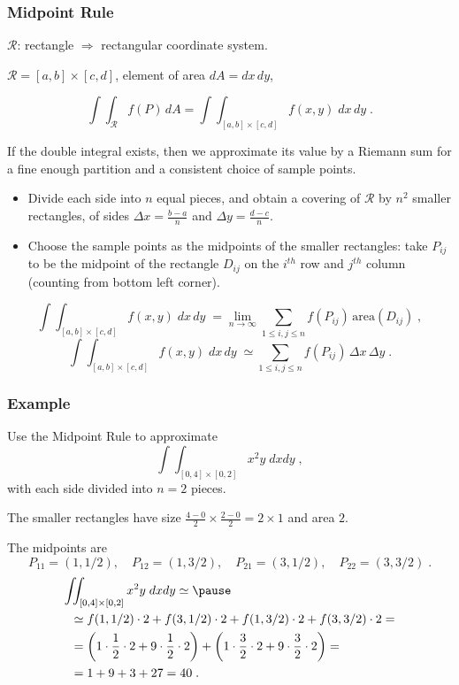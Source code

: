 \begin{frame}
  \frametitle{Midpoint Rule}

  $\mathcal{R}$: rectangle \pause $\Longrightarrow$ rectangular coordinate system.

  $\mathcal{R} = [a,b] \times [c,d]$, element of area $dA = dx\, dy$,

%
$$\int\!\!\!\int_{\mathcal{R}} f(P) \, dA = \int\!\!\!\int_{[a,b] \times [c,d]} f(x,y) \; dx\, dy\; .$$

\pause If the double integral exists, then we approximate its value by a Riemann sum for a fine enough partition and a consistent choice of sample points.
%
\begin{itemize}
  \item \pause Divide each side into $n$ equal pieces, and obtain a covering of $\mathcal{R}$ by $n^2$ smaller rectangles, of sides $\Delta x = \frac{b-a}{n}$ and $\Delta y = \frac{d-c}{n}$.
  \item \pause Choose the sample points as the midpoints of the smaller rectangles: take $P_{ij}$ to be the midpoint of the rectangle $D_{ij}$ on the $i^{th}$ row and $j^{th}$ column (counting from bottom left corner).
\end{itemize}
%
\pause
$$\int\!\!\!\int_{[a,b] \times [c,d]} f(x,y) \; dx\, dy\;  = \lim_{n \to \infty} \sum_{1\leqslant i,j \leqslant n} f(P_{ij}) \, \text{area}(D_{ij})\; ,$$
%
$$\int\!\!\!\int_{[a,b] \times [c,d]} f(x,y) \; dx\, dy\;  \simeq \sum_{1\leqslant i,j \leqslant n} f(P_{ij}) \, \Delta x \, \Delta y\; .$$
%
\end{frame}

\begin{frame}
  \frametitle{Example}

  Use the Midpoint Rule to approximate
%
$$\int\!\!\!\int_{[0,4]\times [0,2]} x^2y\; dxdy\; ,$$
%
with each side divided into $n=2$ pieces.

\pause
The smaller rectangles have size $\frac{4-0}{2} \times \frac{2-0}{2} = 2\times 1$ and area $2$.

\pause
The midpoints are
%
$$P_{11} = (1,1/2), \quad P_{12} = (1,3/2), \quad P_{21} = (3,1/2),  \quad P_{22} = (3,3/2)\; .$$
%
\pause
\begin{align*}
  \int\!\!\!&\int_{[0,4]\times [0,2]} x^2y\; dxdy  \simeq \pause \\
  & \simeq f(1,1/2) \cdot 2 +  f(3,1/2) \cdot 2 + f(1,3/2) \cdot 2  + f(3,3/2) \cdot 2 = \\
  & = \left(1\cdot \frac{1}{2}\cdot 2 + 9 \cdot \frac{1}{2} \cdot 2\right) + \left(1\cdot \frac{3}{2} \cdot 2 + 9 \cdot \frac{3}{2} \cdot 2\right) = \\
  &= 1+9+3+27 = 40\; .
\end{align*}
\end{frame}

